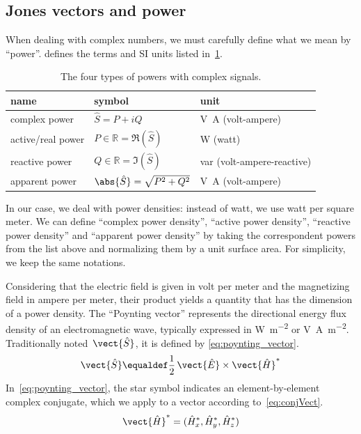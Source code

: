 \subsection{Jones vectors and power}
\label{sec:jones_vectors_and_power}
When dealing with complex numbers, we must carefully define what we mean by ``power''.
 \cite{IEEE2002dictionary} defines the terms and SI units listed in~\cref{tab:complex_powers}.
\begin{table}[hbtp]
    \centering
    \begin{tabular}{lll}
        \toprule
        name & symbol & unit\\
        \midrule
        complex power     & $\hat{S} = P + iQ$\quad & \si{\volt\ampere} (volt-ampere) \\
        active/real power & $P \in \mathbb{R} = \Re(\hat{S})$\quad & \si{\watt} (watt) \\
        reactive power    & $Q \in \mathbb{R} = \Im(\hat{S})$\quad & \si{var} (volt-ampere-reactive) \\
        apparent power    & $\abs{\hat{S}} = \sqrt{P^2 + Q^2}$\quad & \si{\volt\ampere} (volt-ampere) \\
        \bottomrule
    \end{tabular}
    \caption{The four types of powers with complex signals.}
    \label{tab:complex_powers}
\end{table}

In our case, we deal with power densities: instead of watt, we use watt per square meter.
We can define ``complex power density'', ``active power density'', ``reactive power density'' and ``apparent power density'' by taking the correspondent powers from the list above and normalizing them by a unit surface area.
For simplicity, we keep the same notations.

Considering that the electric field is given in volt per meter and the magnetizing field in ampere per meter, their product yields a quantity that has the dimension of a power density.
The ``Poynting vector'' represents the directional energy flux density of an electromagnetic wave, typically expressed in \si{\watt\per\meter\squared} or \si{\volt\ampere\per\meter\squared}.
Traditionally noted~$\vect{\hat{S}}$, it is defined by \cref{eq:poynting_vector}.
\begin{equation}
    \vect{\hat{S}} \equaldef \frac{1}{2}\, \vect{\hat{E}} \times \vect{\hat{H}}^* \label{eq:poynting_vector}
\end{equation}
In~\cref{eq:poynting_vector}, the star symbol indicates an element-by-element complex conjugate, which we apply to a vector according to~\cref{eq:conjVect}.
\begin{equation}
    \vect{\hat{H}}^* = (\hat{H}_x^*, \hat{H}_y^*, \hat{H}_z^*)
    \label{eq:conjVect}
\end{equation}

